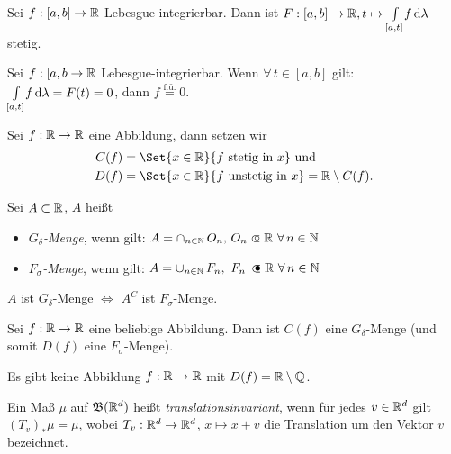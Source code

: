\documentclass{cheat-sheet}
\newcommand{\Bor}{\mathfrak{B}} %
\newcommand{\fue}{\overset{\text{f.ü.}}} %
\begin{document}
\begin{satz}
  Sei $f : [a, b] \to \mathbb{R}$ Lebesgue-integrierbar. Dann ist $F : [a, b] \to \mathbb{R}, t \mapsto {\textstyle \int\limits_{[a, t]}^{}} f \,\mathrm{d} \lambda$ stetig.
\end{satz}

\begin{satz}
  Sei $f : [a, b \to \mathbb{R}$ Lebesgue-integrierbar. Wenn $\forall\,t \in [a, b]$ gilt: ${\textstyle \int\limits_{[a, t]}^{}} f \,\mathrm{d} \lambda = F(t) = 0$, dann $f \fue= 0$.
\end{satz}

\begin{nota}
  Sei $f : \mathbb{R} \to \mathbb{R}$ eine Abbildung, dann setzen wir
  \begin{align*}
    C(f) &= \Set{ x \in \R }{ f \text{ stetig in } x } \text{ und}\\
    D(f) &= \Set{ x \in \R }{ f \text{ unstetig in } x } = \R \setminus C(f).
  \end{align*}
\end{nota}

\begin{defn}
  Sei $A \subset \mathbb{R}$, $A$ heißt
  \begin{itemize}
    \item \emph{$G_{\delta}$-Menge}, wenn gilt: $A = \cap_{n \in \N}\,O_n, \, O_n \opn \R\ \forall\,n \in \N$
    \item \emph{$F_{\sigma}$-Menge}, wenn gilt: $A = \cup_{n \in \N}\,F_n, \,\, F_n \, \cls \R\ \forall\,n \in \N$
  \end{itemize}
\end{defn}

\begin{bem}
  $A $ ist $G_\delta$-Menge $\iff$ $A^C$ ist $F_\sigma$-Menge.
\end{bem}

\begin{satz}[Young]
  Sei $f : \mathbb{R} \to \mathbb{R}$ eine beliebige Abbildung. Dann ist $C(f)$ eine $G_\delta$-Menge (und somit $D(f)$ eine $F_\sigma$-Menge).
\end{satz}

\begin{satz}
  Es gibt keine Abbildung $f : \mathbb{R} \to \mathbb{R}$ mit $D(f) = \mathbb{R} \setminus \mathbb{Q}$.
\end{satz}

\begin{defn}
  Ein Maß $\mu$ auf $\Bor(\R^d)$ heißt \emph{translationsinvariant}, wenn für jedes $v \in \mathbb{R}^d$ gilt $(T_v)_* \mu = \mu$, wobei $T_v : \mathbb{R}^d \to \mathbb{R}^d$, $x \mapsto x + v$ die Translation um den Vektor $v$ bezeichnet.
\end{defn}
\end{document}
